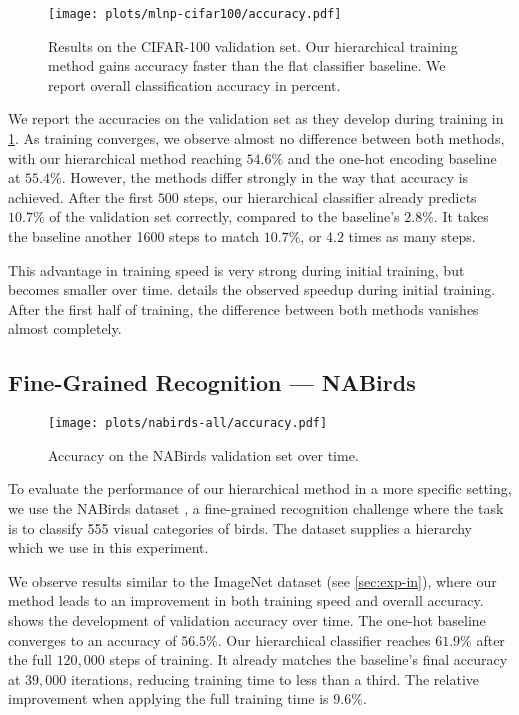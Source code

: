 \documentclass[10pt,twocolumn,letterpaper]{article}
\begin{document}
\begin{figure}
\centering
\texttt{[image: plots/mlnp-cifar100/accuracy.pdf]}
\caption{Results on the CIFAR-100 validation set. Our hierarchical training method gains accuracy faster than the
flat classifier baseline. We report overall classification accuracy in percent.}
\label{fig:expcifargraph}
\end{figure}


We report the accuracies on the validation set as they develop during training in
\cref{fig:expcifargraph}. As training converges, we observe almost no difference
between both methods, with our hierarchical method reaching $54.6\%$ and the one-hot
encoding baseline at $55.4\%$. However, the methods differ strongly in the way that accuracy is
achieved. After the first $500$ steps, our hierarchical classifier already predicts $10.7\%$ of
the validation set correctly, compared to the baseline's $2.8\%$. It takes the baseline another
1600 steps to match $10.7\%$, or $4.2$ times as many steps.

This advantage in training speed is very strong during initial training, but becomes smaller
over time.  details the observed speedup during initial training.
After the first half of training, the difference between both methods vanishes almost completely.


\subsection{Fine-Grained Recognition --- NABirds}
\label{sec:exp-nabirds}
\begin{figure}
\centering
\texttt{[image: plots/nabirds-all/accuracy.pdf]}
\caption{Accuracy on the NABirds validation set over time.}
\label{fig:expnabirdsgraph}
\end{figure}


To evaluate the performance of our hierarchical method in a more specific setting, we
use the NABirds dataset \cite{VanHorn2015NAB}, a fine-grained recognition challenge where
the task is to classify 555 visual categories of birds. The dataset supplies a hierarchy
which we use in this experiment.


We observe results similar to the ImageNet dataset (see \cref{sec:exp-in}), where
our method leads to an improvement in both training speed and overall accuracy.
 shows the development of validation accuracy over time.
The one-hot baseline converges to an accuracy of $56.5\%$. Our hierarchical
classifier reaches $61.9\%$ after the full $120,000$ steps of training. It already
matches the baseline's final accuracy at $39,000$ iterations, reducing training
time to less than a third. The relative improvement when applying the
full training time is $9.6\%$.
\end{document}
